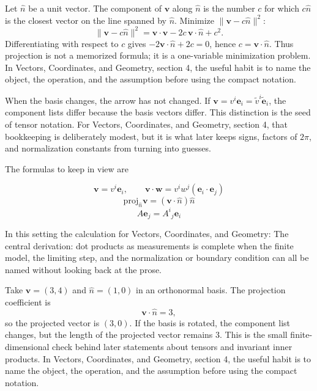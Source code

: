 Let \(\hat n\) be a unit vector.  The component of \(\bm v\) along \(\hat n\) is the number \(c\) for which \(c\hat n\) is the closest vector on the line spanned by \(\hat n\).  Minimize \(\|\bm v-c\hat n\|^2\):
\[
  \|\bm v-c\hat n\|^2=\bm v\cdot\bm v-2c\,\bm v\cdot\hat n+c^2.
\]
Differentiating with respect to \(c\) gives \(-2\bm v\cdot\hat n+2c=0\), hence \(c=\bm v\cdot\hat n\).  Thus projection is not a memorized formula; it is a one-variable minimization problem.  In Vectors, Coordinates, and Geometry, section 4, the useful habit is to name the object, the operation, and the assumption before using the compact notation.

When the basis changes, the arrow has not changed.  If \(\bm v=v^i\bm e_i=\tilde v^i\tilde{\bm e}_i\), the component lists differ because the basis vectors differ.  This distinction is the seed of tensor notation.  For Vectors, Coordinates, and Geometry, section 4, that bookkeeping is deliberately modest, but it is what later keeps signs, factors of \(2\pi\), and normalization constants from turning into guesses.

The formulas to keep in view are

\[
  \bm v=v^i\bm e_i,\qquad \bm v\cdot\bm w=v^iw^j(\bm e_i\cdot\bm e_j)
\]
\[
  \mathrm{proj}_{\hat n}\bm v=(\bm v\cdot\hat n)\hat n
\]
\[
  A\bm e_j=A^i{}_j\bm e_i
\]

In this setting the calculation for Vectors, Coordinates, and Geometry: The central derivation: dot products as measurements is complete when the finite model, the limiting step, and the normalization or boundary condition can all be named without looking back at the prose.




\begin{example}
Take \(\bm v=(3,4)\) and \(\hat n=(1,0)\) in an orthonormal basis.  The projection coefficient is
\[
  \bm v\cdot\hat n=3,
\]
so the projected vector is \((3,0)\).  If the basis is rotated, the component list changes, but the length of the projected vector remains \(3\).  This is the small finite-dimensional check behind later statements about tensors and invariant inner products.  In Vectors, Coordinates, and Geometry, section 4, the useful habit is to name the object, the operation, and the assumption before using the compact notation.
\end{example}



